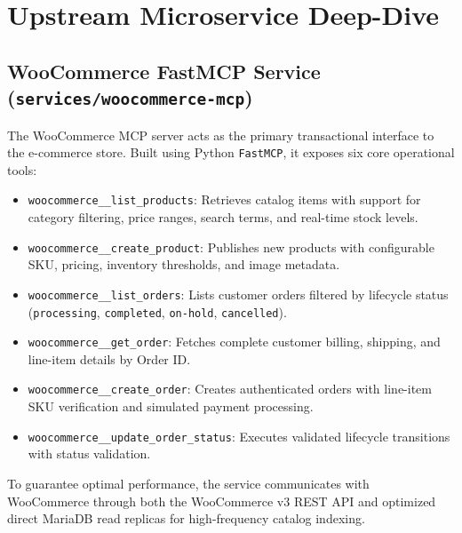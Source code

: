 \documentclass[11pt,a4paper]{article}
\begin{document}
\section{Upstream Microservice Deep-Dive}

\subsection{WooCommerce FastMCP Service (\texttt{services/woocommerce-mcp})}
The WooCommerce MCP server acts as the primary transactional interface to the e-commerce store. Built using Python \texttt{FastMCP}, it exposes six core operational tools:
\begin{itemize}[leftmargin=*]
    \item \texttt{woocommerce\_\_list\_products}: Retrieves catalog items with support for category filtering, price ranges, search terms, and real-time stock levels.
    \item \texttt{woocommerce\_\_create\_product}: Publishes new products with configurable SKU, pricing, inventory thresholds, and image metadata.
    \item \texttt{woocommerce\_\_list\_orders}: Lists customer orders filtered by lifecycle status (\texttt{processing}, \texttt{completed}, \texttt{on-hold}, \texttt{cancelled}).
    \item \texttt{woocommerce\_\_get\_order}: Fetches complete customer billing, shipping, and line-item details by Order ID.
    \item \texttt{woocommerce\_\_create\_order}: Creates authenticated orders with line-item SKU verification and simulated payment processing.
    \item \texttt{woocommerce\_\_update\_order\_status}: Executes validated lifecycle transitions with status validation.
\end{itemize}

\noindent To guarantee optimal performance, the service communicates with WooCommerce through both the WooCommerce v3 REST API and optimized direct MariaDB read replicas for high-frequency catalog indexing.
\end{document}
